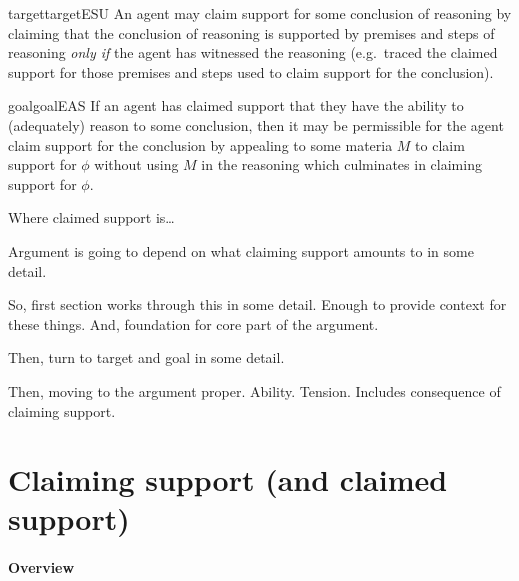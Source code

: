 \begin{note}
  \begin{restatable}[\ESU{-} --- \ESU{}]{target}{targetESU}\label{denied-claim}
    An agent may claim support for some conclusion of reasoning by claiming that the conclusion of reasoning is supported by premises and steps of reasoning \emph{only if} the agent has witnessed the reasoning (e.g.\ traced the claimed support for those premises and steps used to claim support for the conclusion).
  \end{restatable}
\end{note}

\begin{note}
  \begin{restatable}[\EAS{-} --- \EAS{}]{goal}{goalEAS}\label{prop:EAS}
    If an agent has claimed support that they have the ability to (adequately) reason to some conclusion, then it may be permissible for the agent claim support for the conclusion by appealing to some materia \(M\) to claim support for \(\phi\) without using \(M\) in the reasoning which culminates in claiming support for \(\phi\).
  \end{restatable}
\end{note}

\begin{note}
  Where claimed support is\dots
\end{note}

\begin{note}
  Argument is going to depend on what claiming support amounts to in some detail.

  So, first {\color{red} section} works through this in some detail.
  Enough to provide context for these things.
  And, foundation for core part of the argument.

  Then, turn to target and goal in some detail.

  Then, moving to the argument proper.
  Ability.
  Tension.
  Includes consequence of claiming support.
\end{note}

\section{Claiming support (and claimed support)}
\label{sec:abil-access-supp}

\paragraph*{Overview}


